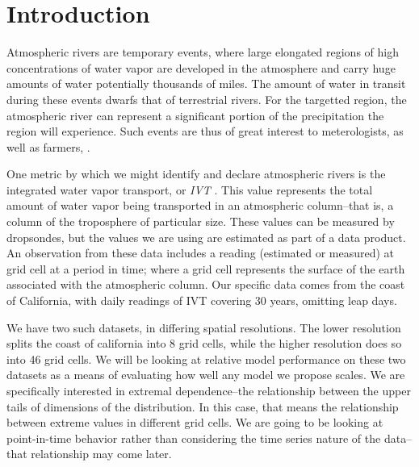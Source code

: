 
\section{Introduction}
Atmospheric rivers are temporary events, where large elongated regions of high concentrations of
  water vapor are developed in the atmosphere and carry huge amounts of water potentially thousands
  of miles.  The amount of water in transit during these events dwarfs that of terrestrial rivers.
  For the targetted region, the atmospheric river can represent a significant portion of the
  precipitation the region will experience.  Such events are thus of great interest to meterologists,
  as well as farmers, .

One metric by which we might identify and declare atmospheric rivers is the integrated water vapor
  transport, or \emph{IVT} .  This value represents the total amount of water vapor being transported
  in an atmospheric column--that is, a column of the troposphere of particular size. These values
  can be measured by dropsondes, but the values we are using are estimated as part of a data
  product.  An observation from these data includes a reading (estimated
  or measured) at grid cell at a period in time; where a grid cell represents the surface of the
  earth associated with the atmospheric column.  Our specific data comes from the coast of California,
  with daily readings of IVT covering 30 years, omitting leap days.

We have two such datasets, in differing spatial resolutions.  The lower resolution splits the coast
  of california into 8 grid cells, while the higher resolution does so into 46 grid cells. 
  We will be looking at relative model performance on these two datasets as a means of evaluating
  how well any model we propose scales.  We are specifically interested in extremal dependence--the
  relationship between the upper tails of dimensions of the distribution.  In this case, that means
  the relationship between extreme values in different grid cells.  We are going to be looking at
  point-in-time behavior rather than considering the time series nature of the data--that
  relationship may come later.

